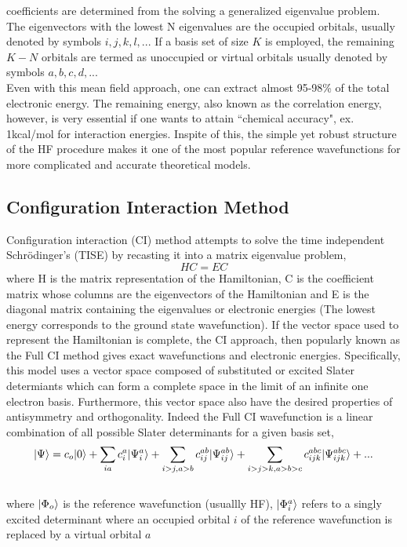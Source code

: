 coefficients are determined from the solving a generalized eigenvalue problem.
The eigenvectors with the lowest N eigenvalues are the occupied orbitals, usually 
denoted by symbols $i,j,k,l,..$. If a basis set of size $K$ is employed, the remaining $K-N$
orbitals are termed as unoccupied or virtual orbitals usually denoted by symbols $a,b,c,d,..$.
\\
Even with this mean field approach, one can extract almost 95-98\% of the total 
electronic energy. The remaining energy, also known as the correlation energy,
however, is very essential if one wants to attain ``chemical accuracy", ex.  
1kcal/mol for interaction energies. Inspite of this, the simple yet robust 
structure of the HF procedure makes it one of the most popular reference 
wavefunctions for more complicated and accurate theoretical models.
\subsection{Configuration Interaction Method}
Configuration interaction (CI) method attempts to solve the time independent 
Schr\"odinger's (TISE) by recasting it into a matrix eigenvalue problem, 
\begin{equation}
HC = EC
\end{equation}
where H is the matrix representation of the Hamiltonian, C is the coefficient matrix
whose columns are the eigenvectors of the Hamiltonian and E is the diagonal matrix 
containing the eigenvalues or electronic energies (The lowest energy corresponds to 
the ground state wavefunction). If the vector space used to represent the Hamiltonian 
is complete, the CI approach, then popularly known as the Full CI method gives exact 
wavefunctions and electronic energies. Specifically, this model uses a vector space 
composed of substituted or excited Slater determiants which can form a complete
space in the limit of an infinite one electron basis. Furthermore, this vector space 
also have the desired properties of antisymmetry and orthogonality. Indeed the Full 
CI wavefunction is a linear combination of all possible Slater determinants for a given basis set,
\\
\begin{equation}
| \Psi \rangle = c_o| 0 \rangle + \sum_{ia}{c}_{i}^{a}| {\Psi}^a_i \rangle + \sum_{i>j,a>b}c_{ij}^{ab}| \Psi^{ab}_{ij} \rangle + \sum_{i>j>k,a>b>c}c_{ijk}^{abc}| \Psi^{abc}_{ijk} \rangle + ...
\end{equation}
\\
where $| \Phi_o \rangle$ is the reference wavefunction (usuallly HF), $| {\Phi}^a_i \rangle$ refers to a singly excited determinant where an occupied orbital $i$ of the reference wavefunction is replaced by a virtual orbital $a$

